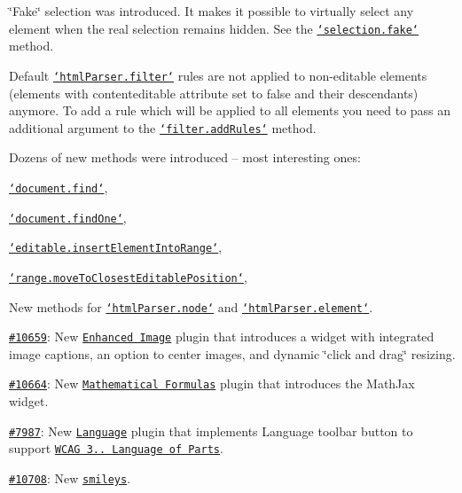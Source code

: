 \begin{DoxyItemize}
\begin{DoxyItemize}
\begin{DoxyItemize}
\end{DoxyItemize}
\item \char`\"{}\-Fake\char`\"{} selection was introduced. It makes it possible to virtually select any element when the real selection remains hidden. See the \href{http://docs.ckeditor.com/#!/api/CKEDITOR.dom.selection-method-fake}{\tt `selection.fake`} method.
\item Default \href{http://docs.ckeditor.com/#!/api/CKEDITOR.htmlParser.filter}{\tt `html\-Parser.filter`} rules are not applied to non-\/editable elements (elements with {\ttfamily contenteditable} attribute set to {\ttfamily false} and their descendants) anymore. To add a rule which will be applied to all elements you need to pass an additional argument to the \href{http://docs.ckeditor.com/#!/api/CKEDITOR.htmlParser.filter-method-addRules}{\tt `filter.add\-Rules`} method.
\item Dozens of new methods were introduced -- most interesting ones\-:
\begin{DoxyItemize}
\item \href{http://docs.ckeditor.com/#!/api/CKEDITOR.dom.document-method-find}{\tt `document.find`},
\item \href{http://docs.ckeditor.com/#!/api/CKEDITOR.dom.document-method-findOne}{\tt `document.find\-One`},
\item \href{http://docs.ckeditor.com/#!/api/CKEDITOR.editable-method-insertElementIntoRange}{\tt `editable.insert\-Element\-Into\-Range`},
\item \href{http://docs.ckeditor.com/#!/api/CKEDITOR.dom.range-method-moveToClosestEditablePosition}{\tt `range.move\-To\-Closest\-Editable\-Position`},
\item New methods for \href{http://docs.ckeditor.com/#!/api/CKEDITOR.htmlParser.node}{\tt `html\-Parser.node`} and \href{http://docs.ckeditor.com/#!/api/CKEDITOR.htmlParser.element}{\tt `html\-Parser.element`}.
\end{DoxyItemize}
\end{DoxyItemize}
\item \href{http://dev.ckeditor.com/ticket/10659}{\tt \#10659}\-: New \href{http://ckeditor.com/addon/image2}{\tt Enhanced Image} plugin that introduces a widget with integrated image captions, an option to center images, and dynamic \char`\"{}click and drag\char`\"{} resizing.
\item \href{http://dev.ckeditor.com/ticket/10664}{\tt \#10664}\-: New \href{http://ckeditor.com/addon/mathjax}{\tt Mathematical Formulas} plugin that introduces the Math\-Jax widget.
\item \href{https://dev.ckeditor.com/ticket/7987}{\tt \#7987}\-: New \href{http://ckeditor.com/addon/language}{\tt Language} plugin that implements Language toolbar button to support \href{http://www.w3.org/TR/UNDERSTANDING-WCAG20/meaning-other-lang-id.html}{\tt W\-C\-A\-G 3.. Language of Parts}.
\item \href{http://dev.ckeditor.com/ticket/10708}{\tt \#10708}\-: New \href{http://ckeditor.com/addon/smiley}{\tt smileys}.
\end{DoxyItemize}


